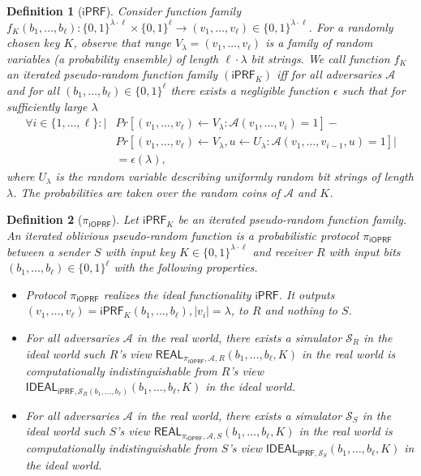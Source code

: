 \documentclass{article}
\newtheorem{definition}{Definition}
\newcommand{\A}[0]{{\mathcal{A}}}
\newcommand{\ioprf}[0]{\mathsf{i}\mathsf{OPRF}}
\newcommand{\iprf}[0]{\mathsf{i}\mathsf{PRF}}
\newcommand{\proto}[0]{{\pi_{\ioprf}}}
\newcommand{\myS}[0]{{\mathcal{S}}}
\begin{document}
\begin{definition}[$\iprf$]
  Consider function family
  $f_K(b_1,\ldots,b_\ell):\{0,1\}^{\lambda\cdot\ell}\times\{0,1\}^{\ell}\rightarrow{}(v_1,\ldots,v_\ell)\in\{0,1\}^{\lambda\cdot\ell}$. For a
  randomly chosen key $K$, observe that range
  $V_\lambda=(v_1,\ldots,v_\ell)$ is a family of random variables (a
  probability ensemble) of length $\ell\cdot\lambda$ bit strings. We
  call function $f_K$ an iterated pseudo-random function family
  $(\iprf_K)$ \emph{iff} for all adversaries $\A$ and for all
  $(b_1,\ldots,b_\ell)\in\{0,1\}^\ell$ there exists a negligible
  function $\epsilon$ such that for sufficiently large $\lambda$
\begin{align*}\forall{}i\in\{1,\ldots,\ell\}:|&Pr[(v_1,\ldots,v_\ell)\leftarrow{}V_\lambda:\A(v_1,\ldots,v_i)=1]-\\&Pr[(v_1,\ldots,v_\ell)\leftarrow{}V_\lambda,u\leftarrow{}U_\lambda:\A(v_1,\ldots,v_{i-1},u)=1]|\\&=\epsilon(\lambda),
  \end{align*}
  where $U_\lambda$ is the random variable describing uniformly random
  bit strings of length $\lambda$. The probabilities are taken over
  the random coins of $\A$ and $K$.

\end{definition}

\begin{definition}[$\proto$]
  Let $\iprf_K$ be an iterated pseudo-random function family.  An
  iterated \emph{oblivious} pseudo-random function is a probabilistic
  protocol $\proto$ between a sender $S$ with input key
  $K\in\{0,1\}^{\lambda\cdot\ell}$ and receiver $R$ with input bits
  $(b_1,\ldots,b_\ell)\in\{0,1\}^{\ell}$ with the following
  properties.

  \begin{itemize}
   
\item Protocol $\proto$ realizes the ideal functionality $\iprf$. It
  outputs
  $(v_1,\ldots,v_\ell)=\iprf_K(b_1,\ldots,b_\ell),|v_i|=\lambda$, to
  $R$ and nothing to $S$.
  
\item For all adversaries $\A$ in the real world, there exists a
  simulator $\myS_R$ in the ideal world such $R$'s view
  $\mathsf{REAL}_{\proto,\A,R}(b_1,\ldots,b_\ell,K)$ in the real world is
  computationally indistinguishable from $R$'s view
  $\mathsf{IDEAL}_{\iprf,\myS_R(b_1,\ldots,b_\ell)}(b_1,\ldots,b_\ell,K)$ in
  the ideal world.

\item
   For all adversaries $\A$ in the real world, there exists a
  simulator $\myS_S$ in the ideal world such $S$'s view
  $\mathsf{REAL}_{\proto,\A,S}(b_1,\ldots,b_\ell,K)$ in the real world is
  computationally indistinguishable from $S$'s view
  $\mathsf{IDEAL}_{\iprf,\myS_S}(b_1,\ldots,b_\ell,K)$ in
  the ideal world.  
\end{itemize}
\end{definition}
\end{document}
